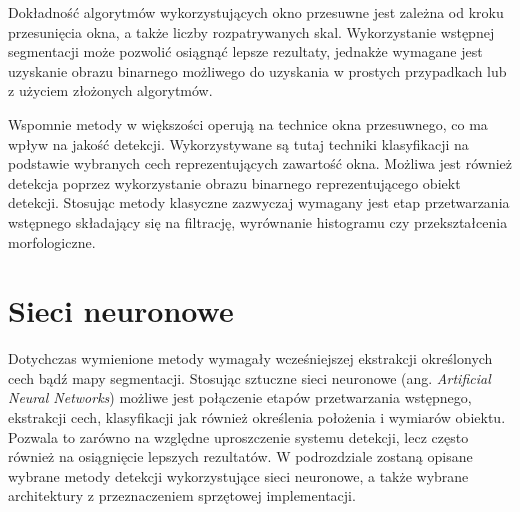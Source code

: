 Dokładność algorytmów wykorzystujących okno przesuwne jest zależna od kroku przesunięcia okna, a także liczby rozpatrywanych skal. 
Wykorzystanie wstępnej segmentacji może pozwolić osiągnąć  lepsze rezultaty, jednakże wymagane jest uzyskanie obrazu binarnego możliwego do uzyskania w prostych przypadkach lub z użyciem złożonych algorytmów. 

Wspomnie metody w większości operują na technice okna przesuwnego, co ma wpływ na jakość detekcji.
Wykorzystywane są tutaj techniki klasyfikacji na podstawie wybranych cech reprezentujących zawartość okna.
Możliwa jest również detekcja poprzez wykorzystanie obrazu binarnego reprezentującego obiekt detekcji.
Stosując metody klasyczne zazwyczaj wymagany jest etap przetwarzania wstępnego składający się na filtrację, wyrównanie histogramu czy przekształcenia morfologiczne.


\section{Sieci neuronowe}

Dotychczas wymienione metody wymagały wcześniejszej ekstrakcji określonych cech bądź mapy segmentacji.
Stosując sztuczne sieci neuronowe (ang. \emph{Artificial Neural Networks}) możliwe jest połączenie etapów przetwarzania wstępnego, ekstrakcji cech, klasyfikacji jak również określenia położenia i wymiarów obiektu. 
Pozwala to zarówno na względne uproszczenie systemu detekcji, lecz często również na osiągnięcie lepszych rezultatów. 
W podrozdziale zostaną opisane wybrane metody detekcji wykorzystujące sieci neuronowe, a także wybrane architektury z przeznaczeniem sprzętowej implementacji.

